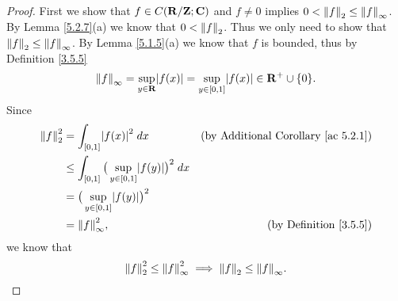 \begin{proof}
    First we show that \(f \in C(\R / \Z ; \C)\) and \(f \neq 0\) implies \(0 < \norm*{f}_2 \leq \norm*{f}_{\infty}\).
    By Lemma \ref{5.2.7}(a) we know that \(0 < \norm*{f}_2\).
    Thus we only need to show that \(\norm*{f}_2 \leq \norm*{f}_\infty\).
    By Lemma \ref{5.1.5}(a) we know that \(f\) is bounded, thus by Definition \ref{3.5.5}
    \[
        \norm*{f}_{\infty} = \sup_{y \in \R} \abs{f(x)} = \sup_{y \in [0, 1]} \abs{f(x)} \in \R^+ \cup \{0\}.
    \]
    Since
    \begin{align*}
        \norm*{f}_2^2 & = \int_{[0, 1]} \abs{f(x)}^2 \; dx                                  & \text{(by Additional Corollary \ref{ac 5.2.1})} \\
                      & \leq \int_{[0, 1]} \big(\sup_{y \in [0, 1]} \abs{f(y)}\big)^2 \; dx                                                   \\
                      & = \big(\sup_{y \in [0, 1]} \abs{f(y)}\big)^2                                                                          \\
                      & = \norm*{f}_{\infty}^2,                                             & \text{(by Definition \ref{3.5.5})}
    \end{align*}
    we know that
    \[
        \norm*{f}_2^2 \leq \norm*{f}_{\infty}^2 \implies \norm*{f}_2 \leq \norm*{f}_{\infty}.
    \]


\end{proof}

